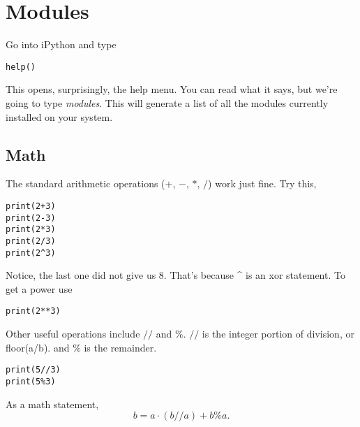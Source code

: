 \documentclass[11pt,letterpaper]{article}
\begin{document}
\section{Modules}
Go into iPython and type
\begin{verbatim}
help()
\end{verbatim}
This opens, surprisingly, the help menu. You can read what it says, but we're going to type
\emph{modules}. This will generate a list of all the modules currently installed on your system. 



\subsection{Math}
The standard arithmetic operations ($+$, $-$, $*$, $/$) work just fine. Try this,

\begin{verbatim}
print(2+3)
print(2-3)
print(2*3)
print(2/3)
print(2^3)
\end{verbatim}
Notice, the last one did not give us 8. That's because \^{} is an xor statement. To get a power use
\begin{verbatim}
print(2**3)
\end{verbatim}

Other useful operations include $//$ and $\%$. $//$ is the integer portion of division, or floor(a/b).
and $\%$ is the remainder. 
\begin{verbatim}
print(5//3)
print(5%3)
\end{verbatim}
As a math statement,
\[
b = a\cdot(b//a) + b\%a.
\]
\end{document}
